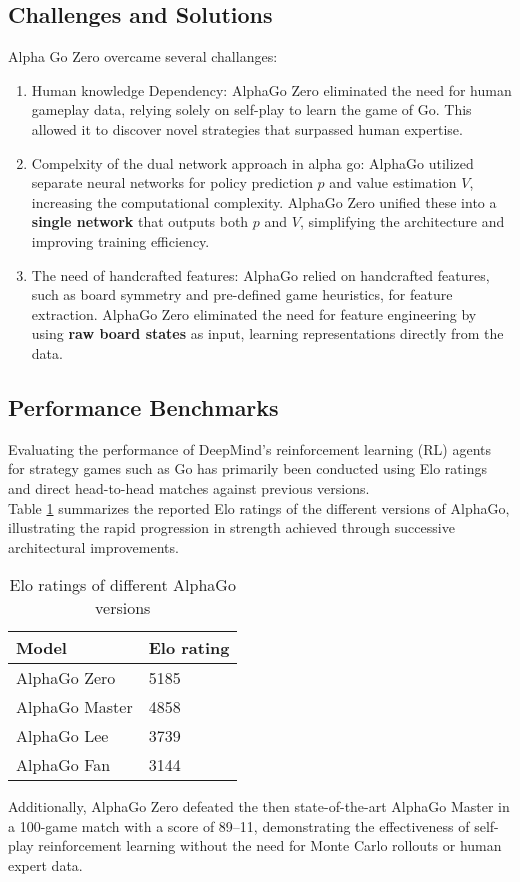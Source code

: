 \subsection{Challenges and Solutions}
Alpha Go Zero overcame several challanges:
\begin{enumerate}
    \item Human knowledge Dependency: AlphaGo Zero eliminated the need for human gameplay
          data, relying solely on self-play to learn the game of Go. This allowed it to
          discover novel strategies that surpassed human expertise.
    \item Compelxity of the dual network approach in alpha go: AlphaGo utilized separate
          neural networks for policy prediction $p$ and value estimation $V$, increasing
          the computational complexity. AlphaGo Zero unified these into a \textbf{single
              network} that outputs both $p$ and $V$, simplifying the architecture and
          improving training efficiency.
    \item The need of handcrafted features: AlphaGo relied on handcrafted features, such
          as board symmetry and pre-defined game heuristics, for feature extraction.
          AlphaGo Zero eliminated the need for feature engineering by using \textbf{raw
              board states} as input, learning representations directly from the data.
\end{enumerate}

\subsection{Performance Benchmarks}

Evaluating the performance of DeepMind’s reinforcement learning (RL) agents for strategy games such as Go has primarily been conducted using Elo ratings and direct head-to-head matches against previous versions. \\

Table \ref{tab:elo_ratings} summarizes the reported Elo ratings of the different versions of AlphaGo, illustrating the rapid progression in strength achieved through successive architectural improvements.

\begin{table}[ht]
\caption{Elo ratings of different AlphaGo versions}
\label{tab:elo_ratings}
\centering
\begin{tabular}{|l|l|}
\hline
Model          & Elo rating \\ \hline
AlphaGo Zero   & 5185       \\ \hline
AlphaGo Master & 4858       \\ \hline
AlphaGo Lee    & 3739       \\ \hline
AlphaGo Fan    & 3144       \\ \hline
\end{tabular}
\end{table}

Additionally, AlphaGo Zero defeated the then state-of-the-art AlphaGo Master in a 100-game match with a score of 89–11, demonstrating the effectiveness of self-play reinforcement learning without the need for Monte Carlo rollouts or human expert data.
